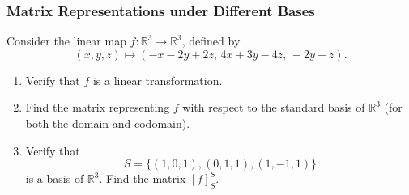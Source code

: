 \documentclass[12pt]{article}
\begin{document}
\subsubsection{Matrix Representations under Different Bases}

Consider the linear map $f:\mathbb{R}^3\rightarrow\mathbb{R}^3$, defined by
\[
(x,y,z)\longmapsto
(-x-2y+2z,\,
4x+3y-4z,\,
-2y+z).
\]

\begin{enumerate}
    \item[(a)] Verify that $f$ is a linear transformation.
    \item[(b)] Find the matrix representing $f$ with respect to the
    standard basis of $\mathbb{R}^3$ (for both the domain and codomain).
    \item[(c)] Verify that
    \[
    S=\{(1,0,1),(0,1,1),(1,-1,1)\}
    \]
    is a basis of $\mathbb{R}^3$. Find the matrix $[f]_S^S$.
\end{enumerate}

\newpage
\end{document}
